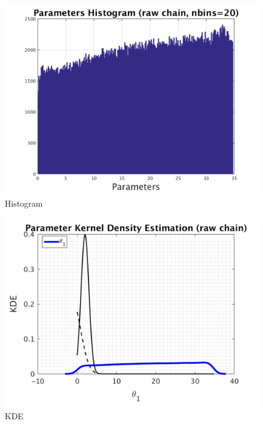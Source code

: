 \begin{figure}[h!]
  
  \centering
   \includegraphics[scale=0.75]{output_10/simple_ip_hist_raw}
   \caption{Histogram}
\end{figure}



\begin{figure}[h!]
  
  \centering
   \includegraphics[scale=0.75]{output_10/simple_ip_kde_raw}
   \caption{ KDE }
\end{figure}

